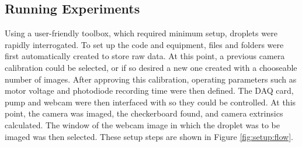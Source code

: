 \documentclass{physics_article_B}
\begin{document}
    \subsection{Running Experiments\label{sect:method:exp}}
        
        Using a user-friendly toolbox, which required minimum setup, droplets were rapidly interrogated. To set up the code and equipment, files and folders were first automatically created to store raw data. At this point, a previous camera calibration could be selected, or if so desired a new one created with a chooseable number of images. After approving this calibration, operating parameters such as motor voltage and photodiode recording time were then defined. The DAQ card, pump and webcam were then interfaced with so they could be controlled. At this point, the camera was imaged, the checkerboard found, and camera extrinsics calculated. The window of the webcam image in which the droplet was to be imaged was then selected. These setup steps are shown in Figure \ref{fig:setup:flow}.
        
\end{document}

